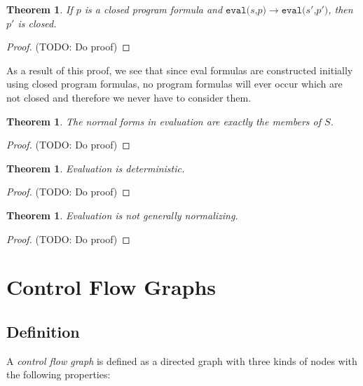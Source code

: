 \documentclass[11pt]{article}
\begin{document}
\newtheorem*{closednessineval}{Theorem}
\begin{closednessineval}
If $p$ is a closed program formula and $\texttt{eval(}s\texttt{,} p\texttt{)} \longrightarrow \texttt{eval(}s'\texttt{,} p'\texttt{)}$, then $p'$ is closed.
\end{closednessineval}

\begin{proof}
(TODO: Do proof)
\end{proof}

As a result of this proof, we see that since eval formulas are constructed initially using closed program formulas, no program formulas will ever occur which are not closed and therefore we never have to consider them.

\newtheorem*{evalnormalforms}{Theorem}
\begin{evalnormalforms}
The normal forms in evaluation are exactly the members of $S$.
\end{evalnormalforms}

\begin{proof}
(TODO: Do proof)
\end{proof}

\newtheorem*{evaldeterminism}{Theorem}
\begin{evaldeterminism}
Evaluation is deterministic.
\end{evaldeterminism}

\begin{proof}
(TODO: Do proof)
\end{proof}

\newtheorem*{evalnotnormalizing}{Theorem}
\begin{evalnotnormalizing}
Evaluation is not generally normalizing.
\end{evalnotnormalizing}

\begin{proof}
(TODO: Do proof)
\end{proof}

\section{Control Flow Graphs}

\subsection{Definition}

A \emph{control flow graph} is defined as a directed graph with three kinds of nodes with the following properties:
\end{document}
